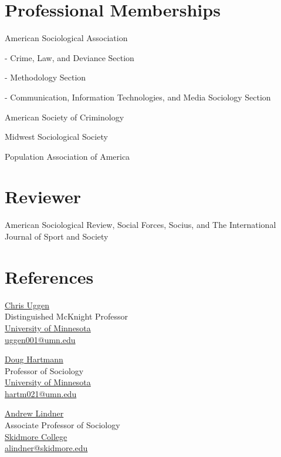 \documentclass[letterpaper]{article}
\renewenvironment{itemize}{
  \begin{list}{}{
    \setlength{\leftmargin}{1.5em}
  }
}{
  \end{list}
}
\begin{document}
\section*{\textbf{Professional Memberships}}
\begin{itemize}

\item American Sociological Association
\begin{itemize}
\item - Crime, Law, and Deviance Section
\item - Methodology Section
\item - Communication, Information Technologies, and Media Sociology Section
\end{itemize}
\item American Society of Criminology
\item Midwest Sociological Society
\item Population Association of America

\end{itemize}

\section*{\textbf{Reviewer}}

American Sociological Review, Social Forces, Socius, and The International Journal of Sport and Society

\section*{\textbf{References}}

\begin{minipage}{0.4\linewidth}
  \href{ http://www.soc.umn.edu/~uggen/}{Chris Uggen} \\
   Distinguished McKnight Professor \\
   \href{http://www.umn.edu/}{University of Minnesota}\\
  \href{mailto:uggen001@umn.edu}{uggen001@umn.edu}
\end{minipage}
\begin{minipage}{0.33\linewidth}
  \href{http://cla.umn.edu/about/directory/profile/hartm021}{Doug Hartmann} \\
   Professor of Sociology \\
   \href{http://www.umn.edu/}{University of Minnesota}\\
  \href{mailto:hartm021@umn.edu}{hartm021@umn.edu}
\end{minipage}
\begin{minipage}{0.33\linewidth}
  \href{https://academics.skidmore.edu/blogs/alindner/}{Andrew Lindner} \\
   Associate Professor of Sociology \\
   \href{http://www.skidmore.edu/}{Skidmore College}\\
  \href{mailto:alindner@skidmore.edu}{alindner@skidmore.edu}
\end{minipage}
\end{document}
